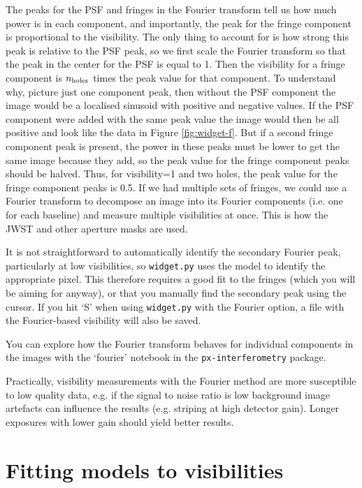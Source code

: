 \documentclass[11pt]{article}
\begin{document}
The peaks for the PSF and fringes in the Fourier transform tell us how much power is in each component, and importantly, the peak for the fringe component is proportional to the visibility. The only thing to account for is how strong this peak is relative to the PSF peak, so we first scale the Fourier transform so that the peak in the center for the PSF is equal to 1. Then the visibility for a fringe component is $n_{\rm holes}$ times the peak value for that component. To understand why, picture just one component peak, then without the PSF component the image would be a localised sinusoid with positive and negative values. If the PSF component were added with the same peak value the image would then be all positive and look like the data in Figure \ref{fig:widget-f}. But if a second fringe component peak is present, the power in these peaks must be lower to get the same image because they add, so the peak value for the fringe component peaks should be halved. Thus, for visibility=1 and two holes, the peak value for the fringe component peaks is 0.5. If we had multiple sets of fringes, we could use a Fourier transform to decompose an image into its Fourier components (i.e. one for each baseline) and measure multiple visibilities at once. This is how the JWST and other aperture masks are used.

It is not straightforward to automatically identify the secondary Fourier peak, particularly at low visibilities, so \texttt{widget.py} uses the model to identify the appropriate pixel. This therefore requires a good fit to the fringes (which you will be aiming for anyway), or that you manually find the secondary peak using the cursor. If you hit `S' when using \texttt{widget.py} with the Fourier option, a file with the Fourier-based visibility will also be saved.

You can explore how the Fourier transform behaves for individual components in the images with the `fourier' notebook in the \texttt{px-interferometry} package.

Practically, visibility measurements with the Fourier method are more susceptible to low quality data, e.g. if the signal to noise ratio is low background image artefacts can influence the results (e.g. striping at high detector gain). Longer exposures with lower gain should yield better results. 

\section{Fitting models to visibilities}\label{sec:models}
\end{document}

